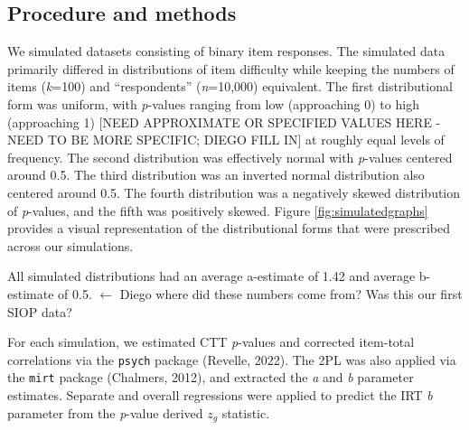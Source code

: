 \documentclass[
  man]{apa6}
\begin{document}
\hypertarget{procedure-and-methods}{%
\subsection{Procedure and methods}\label{procedure-and-methods}}

We simulated datasets consisting of binary item responses. The simulated data primarily differed in distributions of item difficulty while keeping the numbers of items (\emph{k}=100) and ``respondents'' (\emph{n}=10,000) equivalent. The first distributional form was uniform, with \emph{p}-values ranging from low (approaching 0) to high (approaching 1) {[}NEED APPROXIMATE OR SPECIFIED VALUES HERE - NEED TO BE MORE SPECIFIC; DIEGO FILL IN{]} at roughly equal levels of frequency. The second distribution was effectively normal with \emph{p}-values centered around 0.5. The third distribution was an inverted normal distribution also centered around 0.5. The fourth distribution was a negatively skewed distribution of \emph{p}-values, and the fifth was positively skewed. Figure \ref{fig:simulatedgraphs} provides a visual representation of the distributional forms that were prescribed across our simulations.

All simulated distributions had an average a-estimate of 1.42 and average b-estimate of 0.5. \(\leftarrow\) Diego where did these numbers come from? Was this our first SIOP data?

For each simulation, we estimated CTT \emph{p}-values and corrected item-total correlations via the \texttt{psych} package (Revelle, 2022). The 2PL was also applied via the \texttt{mirt} package (Chalmers, 2012), and extracted the \emph{a} and \emph{b} parameter estimates. Separate and overall regressions were applied to predict the IRT \emph{b} parameter from the \emph{p}-value derived \(z_g\) statistic.
\end{document}
